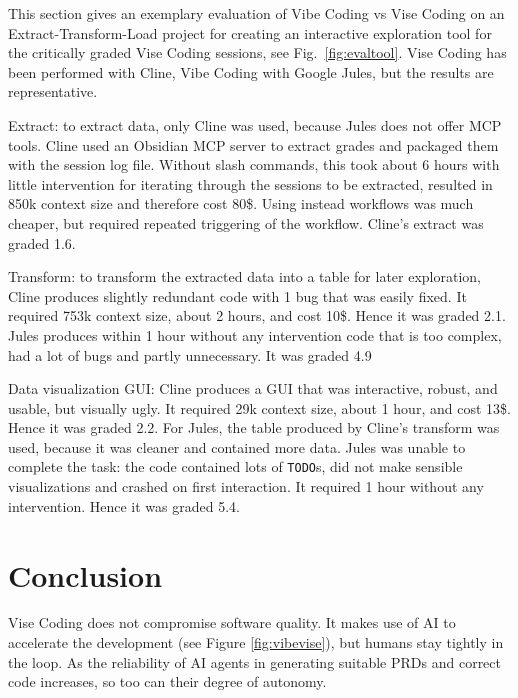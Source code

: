 \documentclass[twocolumn,german]{article}
\begin{document}
This section gives an exemplary evaluation of Vibe Coding vs Vise Coding on an Extract-Transform-Load project for creating an interactive exploration tool
for the critically graded Vise Coding sessions, see Fig.~\ref{fig:evaltool}. Vise Coding has been performed with Cline, Vibe Coding with Google Jules,
but the results are representative.

Extract: to extract data, only Cline was used, because Jules does not offer MCP tools. Cline used an Obsidian MCP server to extract grades
and packaged them with the session log file.
Without slash commands, this took about 6 hours with little intervention for iterating through the sessions to be extracted,
resulted in 850k context size and therefore cost 80\$. Using instead workflows was much cheaper,
but required repeated triggering of the workflow. Cline's extract was graded 1.6.

Transform: to transform the extracted data into a table for later exploration,
Cline produces slightly redundant code with 1 bug that was easily fixed.
It required 753k context size, about 2 hours, and cost 10\$. Hence it was graded 2.1.
Jules produces within 1 hour without any intervention code that is too complex, had a lot of bugs and partly unnecessary. 
It was graded 4.9

Data visualization GUI: Cline produces a GUI that was interactive, robust, and usable, but visually ugly.
It required 29k context size, about 1 hour, and cost 13\$. Hence it was graded 2.2.
For Jules, the table produced by Cline's transform was used, because it was cleaner and contained more data.
Jules was unable to complete the task: the code contained lots of \lstinline|TODO|s,
did not make sensible visualizations and crashed on first interaction.
It required 1 hour without any intervention. Hence it was graded 5.4.

\section{Conclusion}
Vise Coding does not compromise software quality.
It makes use of AI to accelerate the development (see Figure \ref{fig:vibevise}),
but humans stay tightly in the loop.
As the reliability of AI agents in generating suitable PRDs and correct code increases, so too can their degree of autonomy.
\end{document}
